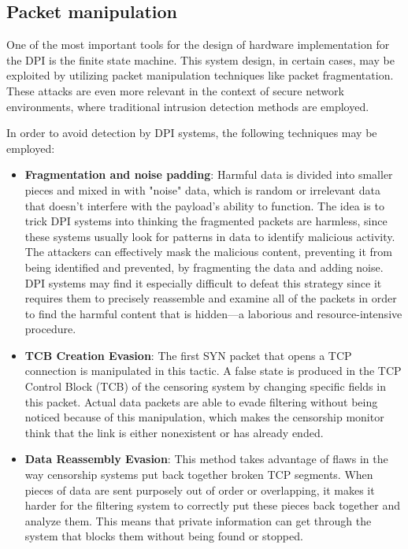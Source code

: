 \documentclass[12pt, fleqn, a4paper]{article}
\begin{document}
\subsection{Packet manipulation}
One of the most important tools for the design of hardware implementation for the DPI is the finite state machine. This system design, in certain cases, may be exploited by utilizing packet manipulation techniques like packet fragmentation. \citep{dpisurvey2}
These attacks are even more relevant in the context of secure network environments, where traditional intrusion detection methods are employed.

In order to avoid detection by DPI systems, the following techniques may be employed:
\begin{itemize}
  \item \textbf{Fragmentation and noise padding}: Harmful data is divided into smaller pieces and mixed in with "noise" data, which is random or irrelevant data that doesn't interfere with the payload's ability to function. The idea is to trick DPI systems into thinking the fragmented packets are harmless, since these systems usually look for patterns in data to identify malicious activity. The attackers can effectively mask the malicious content, preventing it from being identified and prevented, by fragmenting the data and adding noise. DPI systems may find it especially difficult to defeat this strategy since it requires them to precisely reassemble and examine all of the packets in order to find the harmful content that is hidden—a laborious and resource-intensive procedure. \citep{dpifragmentation}
  \item \textbf{TCB Creation Evasion}: The first SYN packet that opens a TCP connection is manipulated in this tactic. A false state is produced in the TCP Control Block (TCB) of the censoring system by changing specific fields in this packet. Actual data packets are able to evade filtering without being noticed because of this manipulation, which makes the censorship monitor think that the link is either nonexistent or has already ended. \citep{censorshipdetection}
  \item \textbf{Data Reassembly Evasion}: This method takes advantage of flaws in the way censorship systems put back together broken TCP segments. When pieces of data are sent purposely out of order or overlapping, it makes it harder for the filtering system to correctly put these pieces back together and analyze them. This means that private information can get through the system that blocks them without being found or stopped. \citep{datareassembly}

\end{itemize}
\end{document}
